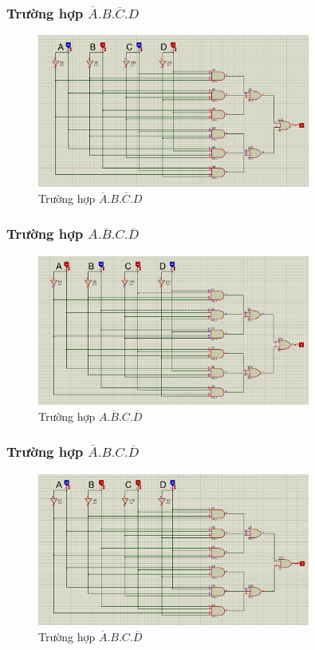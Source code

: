         \subsubsection{Trường hợp $\overline{A}.B.\overline{C}.D$}
            \begin{figure}[H]
                \centering
                \includegraphics[width=0.8\textwidth]{pictures/b2.4.png}
                \caption{Trường hợp $\overline{A}.B.\overline{C}.D$}
            \end{figure}
        \subsubsection{Trường hợp $A.\overline{B}.C.\overline{D}$}
            \begin{figure}[H]
                \centering
                \includegraphics[width=0.8\textwidth]{pictures/b2.3.png}
                \caption{Trường hợp $A.\overline{B}.C.\overline{D}$}
            \end{figure}
        \subsubsection{Trường hợp $\overline{A}.B.C.\overline{D}$}
            \begin{figure}[H]
                \centering
                \includegraphics[width=0.8\textwidth]{pictures/b2.6.png}
                \caption{Trường hợp $\overline{A}.B.C.\overline{D}$}
            \end{figure}
